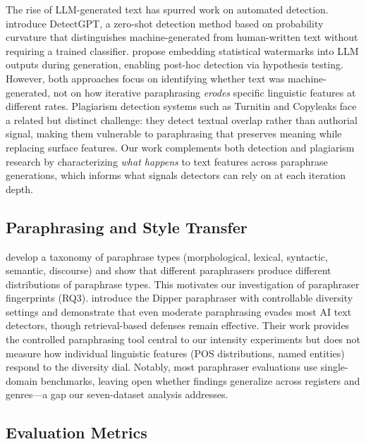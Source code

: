 The rise of LLM-generated text has spurred work on automated detection. \citet{mitchell2023detectgpt} introduce DetectGPT, a zero-shot detection method based on probability curvature that distinguishes machine-generated from human-written text without requiring a trained classifier. \citet{kirchenbauer2023watermark} propose embedding statistical watermarks into LLM outputs during generation, enabling post-hoc detection via hypothesis testing. However, both approaches focus on identifying whether text was machine-generated, not on how iterative paraphrasing \emph{erodes} specific linguistic features at different rates. Plagiarism detection systems such as Turnitin and Copyleaks face a related but distinct challenge: they detect textual overlap rather than authorial signal, making them vulnerable to paraphrasing that preserves meaning while replacing surface features. Our work complements both detection and plagiarism research by characterizing \emph{what happens} to text features across paraphrase generations, which informs what signals detectors can rely on at each iteration depth.

\subsection{Paraphrasing and Style Transfer}

\citet{wahle2023paraphrase} develop a taxonomy of paraphrase types (morphological, lexical, syntactic, semantic, discourse) and show that different paraphrasers produce different distributions of paraphrase types. This motivates our investigation of paraphraser fingerprints (RQ3). \citet{krishna2023dipper} introduce the Dipper paraphraser with controllable diversity settings and demonstrate that even moderate paraphrasing evades most AI text detectors, though retrieval-based defenses remain effective. Their work provides the controlled paraphrasing tool central to our intensity experiments but does not measure how individual linguistic features (POS distributions, named entities) respond to the diversity dial. Notably, most paraphraser evaluations use single-domain benchmarks, leaving open whether findings generalize across registers and genres---a gap our seven-dataset analysis addresses.

\subsection{Evaluation Metrics}

